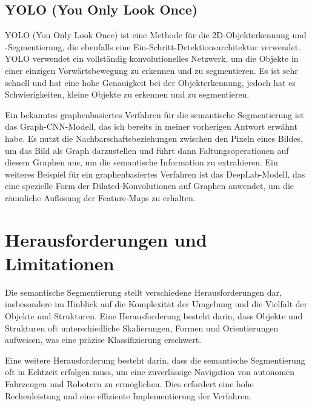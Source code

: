 \subsection{YOLO (You Only Look Once)}
YOLO (You Only Look Once) ist eine Methode für die 2D-Objekterkennung und
-Segmentierung, die ebenfalls eine Ein-Schritt-Detektionsarchitektur verwendet.
YOLO verwendet ein vollständig konvolutionelles Netzwerk, um die Objekte in
einer einzigen Vorwärtsbewegung zu erkennen und zu segmentieren. Es ist sehr
schnell und hat eine hohe Genauigkeit bei der Objekterkennung, jedoch hat es
Schwierigkeiten, kleine Objekte zu erkennen und zu segmentieren.

Ein bekanntes graphenbasiertes Verfahren für die semantische Segmentierung ist
das Graph-CNN-Modell, das ich bereits in meiner vorherigen Antwort erwähnt
habe. Es nutzt die Nachbarschaftsbeziehungen zwischen den Pixeln eines Bildes,
um das Bild als Graph darzustellen und führt dann Faltungsoperationen auf
diesem Graphen aus, um die semantische Information zu extrahieren. Ein weiteres
Beispiel für ein graphenbasiertes Verfahren ist das DeepLab-Modell, das eine
spezielle Form der Dilated-Konvolutionen auf Graphen anwendet, um die räumliche
Auflösung der Feature-Maps zu erhalten.

\section{Herausforderungen und Limitationen}
Die semantische Segmentierung stellt verschiedene Herausforderungen dar,
insbesondere im Hinblick auf die Komplexität der Umgebung und die Vielfalt der
Objekte und Strukturen. Eine Herausforderung besteht darin, dass Objekte und
Strukturen oft unterschiedliche Skalierungen, Formen und Orientierungen
aufweisen, was eine präzise Klassifizierung erschwert.

Eine weitere Herausforderung besteht darin, dass die semantische Segmentierung
oft in Echtzeit erfolgen muss, um eine zuverlässige Navigation von autonomen
Fahrzeugen und Robotern zu ermöglichen. Dies erfordert eine hohe Rechenleistung
und eine effiziente Implementierung der Verfahren.